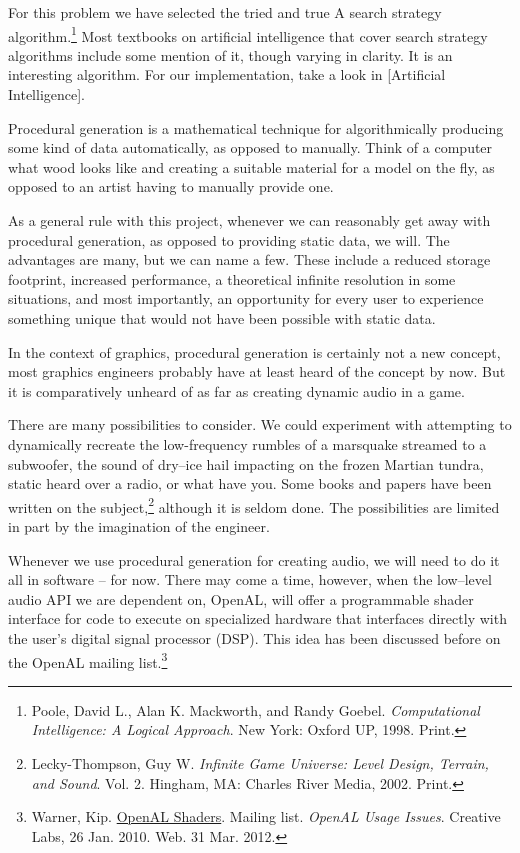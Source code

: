 For this problem we have selected the tried and true A\high{*} search strategy algorithm.\footnote{Poole, David L., Alan K. Mackworth, and Randy Goebel. {\it Computational Intelligence: A Logical Approach}. New York: Oxford UP, 1998. Print.} Most textbooks on artificial intelligence that cover search strategy algorithms include some mention of it, though varying in clarity. It is an interesting algorithm. For our implementation, take a look in [Artificial Intelligence].

Procedural generation is a mathematical technique for algorithmically producing some kind of data automatically, as opposed to manually. Think of a computer  what wood looks like and creating a suitable material for a model on the fly, as opposed to an artist having to manually provide one. 

As a general rule with this project, whenever we can reasonably get away with procedural generation, as opposed to providing static data, we will. The advantages are many, but we can name a few. These include a reduced storage footprint, increased performance, a theoretical infinite resolution in some situations, and most importantly, an opportunity for every user to experience something unique that would not have been possible with static data.

In the context of graphics, procedural generation is certainly not a new concept, most graphics engineers probably have at least heard of the concept by now. But it is comparatively unheard of as far as creating dynamic audio in a game. 

There are many possibilities to consider. We could experiment with attempting to dynamically recreate the low-frequency rumbles of a marsquake streamed to a subwoofer, the sound of dry--ice hail impacting on the frozen Martian tundra, static heard over a radio, or what have you. Some books and papers have been written on the subject,\footnote{Lecky-Thompson, Guy W. {\it Infinite Game Universe: Level Design, Terrain, and Sound}. Vol. 2. Hingham, MA: Charles River Media, 2002. Print.} although it is seldom done. The possibilities are limited in part by the imagination of the engineer.

Whenever we use procedural generation for creating audio, we will need to do it all in software -- for now. There may come a time, however, when the low--level audio API we are dependent on, OpenAL, will offer a programmable shader interface for code to execute on specialized hardware that interfaces directly with the user's digital signal processor (DSP). This idea has been discussed before on the OpenAL mailing list.\footnote{Warner, Kip. \href{http://opensource.creative.com/pipermail/openal/2010-January/011972.html}{OpenAL Shaders}. Mailing list. {\it OpenAL Usage Issues}. Creative Labs, 26 Jan. 2010. Web. 31 Mar. 2012.}

